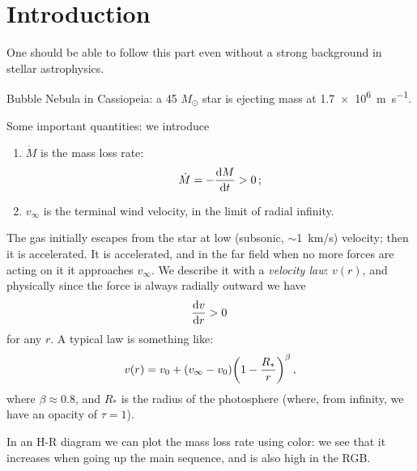 \documentclass[main.tex]{subfiles}
\begin{document}

\section{Introduction}


One should be able to follow this part even without a strong background in stellar astrophysics.

Bubble Nebula in Cassiopeia: a 45 \(M_{\odot}\) star is ejecting mass at \SI{1.7e6}{m\per\second}.

Some important quantities: we introduce 

\begin{enumerate}
    \item \(\dot{M}\) is the mass loss rate: 
    \begin{equation}
      \dot{M} = - \dv{M}{t} >0
    \,;
    \end{equation}
    \item \(v_{\infty}\) is the terminal wind velocity, in the limit of radial infinity.
\end{enumerate}

The gas initially escapes from the star at low (subsonic, \(\sim\)\SI{1}{km/s}) velocity; then it is accelerated.
It is accelerated, and in the far field when no more forces are acting on it it approaches \(v_{\infty}\).
We describe it with a \emph{velocity law}: \(v(r)\), and physically since the force is always radially outward we have 
%
\begin{equation}
  \dv{v}{r} > 0
\,
\end{equation}
%
for any \(r\). A typical law is something like: 
%
\begin{equation}
  v(r) = v_0 + \qty(v_{\infty}-v_{0} ) \qty(1 - \frac{R_{*}}{r})^{\beta }
\,,
\end{equation}
%
where \(\beta \approx 0.8\), and \(R_{*}\) is the radius of the photosphere (where, from infinity, we have an opacity of \(\tau = 1\)).

In an H-R diagram we can plot the mass loss rate using color: we see that it increases when going up the main sequence, and is also high in the RGB.
\end{document}
